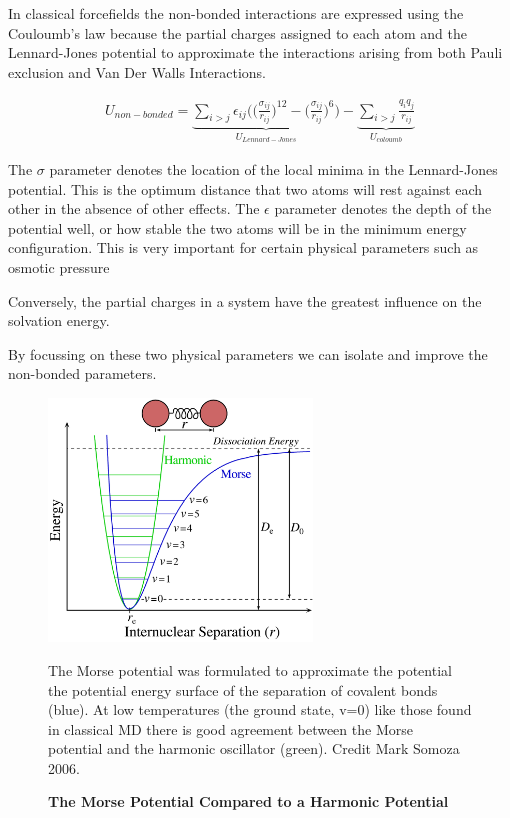 In classical forcefields the non-bonded interactions are expressed using the Couloumb's law because the partial charges assigned to each atom and the Lennard-Jones potential to approximate the interactions arising from both Pauli exclusion and Van Der Walls Interactions.


\begin{equation}\label{nonbonded_eqs}
	\begin{aligned}
		U_{non-bonded} = \underbrace{\sum_{i>j} \epsilon_{ij} \Big( \Big(\frac{\sigma_{ij}}{r_{ij}}\Big)^{12} - \Big(\frac{\sigma_{ij}}{r_{ij}}\Big)^{6} \Big)}_{U_{Lennard-Jones}} - \underbrace{\sum_{i>j} \frac{q_i q_j } {r_{ij}}}_{U_{coloumb}}
	\end{aligned}
\end{equation}


The $\sigma$ parameter denotes the location of the local minima in the Lennard-Jones potential. This is the optimum distance that two atoms will rest against each other in the absence of other effects. The $\epsilon$ parameter denotes the depth of the potential well, or how stable the two atoms will be in the minimum energy configuration. This is very important for certain physical parameters such as osmotic pressure  \cite{Yoo2018}

Conversely, the partial charges in a system have the greatest influence on the solvation energy.

By focussing on these two physical parameters we can isolate and improve the non-bonded parameters.

\begin{figure}
	\begin{center}
	\includegraphics[width=7cm]{figures/Morse-Potential.png}
	\end{center}
	\captionsetup{singlelinecheck = false, justification=raggedright}
	\caption[The Morse Potential Compared to a Harmonic Potential] {\textbf{The Morse Potential Compared to a Harmonic Potential}}{
		The Morse potential was formulated to approximate the potential the potential energy surface of the separation of covalent bonds (blue). At low temperatures (the ground state, v=0) like those found in classical MD there is good agreement between the Morse potential and the harmonic oscillator (green). Credit Mark Somoza 2006. 
}
	\label{morse_potential}
\end{figure}

